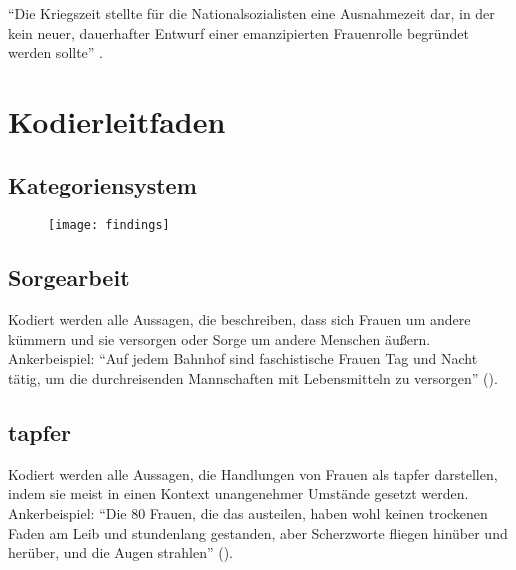 \documentclass[12pt, titlepage=true, toc=bib]{scrartcl}
\begin{document}
{"`Die Kriegszeit stellte für die Nationalsozialisten eine Ausnahmezeit dar, in der kein neuer, dauerhafter Entwurf einer emanzipierten Frauenrolle begründet werden sollte"' \cite[278]{scheidgen_frauenbilder_2015}.

\newpage

\nocite{medici_faschistische_1941}
\nocite{a._v._s._kameradschaft_1936}
\nocite{maltzahn_deutsche_1936}
\nocite{reimer_glucklich_1941}
\nocite{scholtz-klink_frauen_1936}
\nocite{weinhandl_wie_1941}
\nocite{friewart_japanisches_1941}


\printbibheading[title=Literaturverzeichnis]
\printbibliography[heading=subbibliography, keyword={Quelle}, title={Quellen}]
\printbibliography[heading=subbibliography, notkeyword={Quelle}]
\newpage

\appendix

\addpart{\appendixname}

\section{Kodierleitfaden}

\subsection*{Kategoriensystem}

\begin{figure}[htbp] %

\texttt{[image: findings]}
\end{figure}


\subsection*{Sorgearbeit}

Kodiert werden alle Aussagen, die beschreiben, dass sich Frauen um andere kümmern und sie versorgen oder Sorge um andere Menschen äußern.\\
Ankerbeispiel: "`Auf jedem Bahnhof sind faschistische Frauen Tag und Nacht tätig, um die durchreisenden Mannschaften mit Lebensmitteln zu versorgen"' (\cite[3]{medici_faschistische_1941}).

\subsection*{tapfer}

Kodiert werden alle Aussagen, die Handlungen von Frauen als tapfer darstellen, indem sie meist in einen Kontext unangenehmer Umstände gesetzt werden.\\
Ankerbeispiel: "`Die 80 Frauen, die das austeilen, haben wohl keinen trockenen Faden am Leib und stundenlang gestanden, aber Scherzworte fliegen hinüber und herüber, und die Augen strahlen"' (\cite[775]{a._v._s._kameradschaft_1936}).

}
\end{document}
